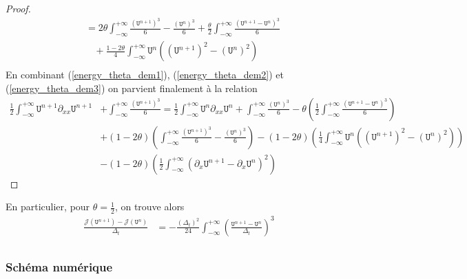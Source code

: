 \documentclass[12pt,a4paper]{article}
\numberwithin{equation}{section}
\begin{document}
\begin{proof}
\begin{equation}
\begin{split}
   &=2\theta\int_{-\infty}^{+\infty} \frac{(\texttt{U}^{n+1})^3}{6}-\frac{(\texttt{U}^n)^3}{6} + \frac{\theta}{2}\int_{-\infty}^{+\infty}\frac{(\texttt{U}^{n+1} - \texttt{U}^n)^3}{6} \\
   &~~~~+ \frac{1-2\theta}{4}\int_{-\infty}^{+\infty}\texttt{U}^n \left((\texttt{U}^{n+1})^2-(\texttt{U}^n)^2\right)  \\
\end{split}
\end{equation}
En combinant (\ref{energy_theta_dem1}), (\ref{energy_theta_dem2}) et (\ref{energy_theta_dem3}) on parvient finalement à la relation
\begin{equation*}
\begin{aligned}
    \frac{1}{2}\int_{-\infty}^{+\infty} \texttt{U}^{n+1}\partial_{xx}\texttt{U}^{n+1} &+  \int_{-\infty}^{+\infty}\frac{(\texttt{U}^{n+1})^3}{6} =   \frac{1}{2}\int_{-\infty}^{+\infty}\texttt{U}^{n}\partial_{xx}\texttt{U}^{n}+ \int_{-\infty}^{+\infty} \frac{(\texttt{U}^{n})^3}{6} - \theta \left(\frac{1}{2}\int_{-\infty}^{+\infty}\frac{(\texttt{U}^{n+1} - \texttt{U}^n)^3}{6}\right)\\
    &+ (1-2\theta)\left(\int_{-\infty}^{+\infty} \frac{(\texttt{U}^{n+1})^3}{6}-\frac{(\texttt{U}^n)^3}{6}  \right) - (1-2\theta)\left(\frac{1}{4}\int_{-\infty}^{+\infty}\texttt{U}^n \left((\texttt{U}^{n+1})^2-(\texttt{U}^n)^2\right) \right) \\
    &- (1-2\theta)\left(\frac{1}{2}\int_{-\infty}^{+\infty}(\partial_{x}\texttt{U}^{n+1}-\partial_{x}\texttt{U}^n)^2 \right)
\end{aligned}
\end{equation*}
\end{proof}

En particulier, pour $\theta = \frac{1}{2}$, on trouve alors
\begin{equation*}
\begin{aligned}
    \frac{\mathcal{J}(\texttt{U}^{n+1})- \mathcal{J}(\texttt{U}^{n})}{\Delta_t} &= - \frac{(\Delta_t)^2}{24} \int_{-\infty}^{+\infty}\left(\frac{\texttt{U}^{n+1} - \texttt{U}^n}{\Delta_t}\right)^3\\
\end{aligned}
\end{equation*}



\subsubsection{Schéma numérique}
\end{document}
